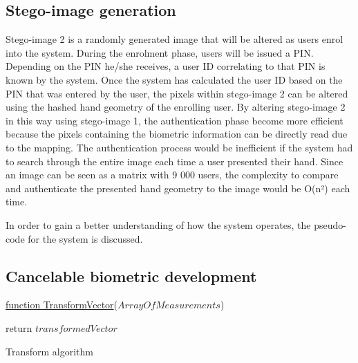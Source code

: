 \subsection{Stego-image generation}

Stego-image 2 is a randomly generated image that will be altered as users enrol into the system. During the enrolment phase, users will be issued a PIN. Depending on the PIN he/she receives, a user ID correlating to that PIN is known by the system. Once the system has calculated the user ID based on the PIN that was entered by the user, the pixels within stego-image 2 can be altered using the hashed hand geometry of the enrolling user. By altering stego-image 2 in this way using stego-image 1, the authentication phase become more efficient because the pixels containing the biometric information can be directly read due to the mapping. The authentication process would be inefficient if the system had to search through the entire image each time a user presented their hand. Since an image can be seen as a matrix with 9 000 users, the complexity to compare and authenticate the presented hand geometry to the image would be O(n²) each time. 

In order to gain a better understanding of how the system operates, the pseudo-code for the system is discussed.

\subsection{Cancelable biometric development}


\begin{algorithm}
     
     \underline{function TransformVector}($ArrayOfMeasurements$)\;
     
     
     return $transformedVector$\;
     \caption{Transform algorithm}
     \label{alg: Transform algorithm}
     
\end{algorithm}


